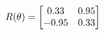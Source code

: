\documentclass[preview]{standalone}
\begin{document}
\begin{align*}
\special{dvisvgm:raw <g id='unique000'>}R(\theta) = \begin{bmatrix}0.33 & 0.95\\-0.95 & 0.33\end{bmatrix}\special{dvisvgm:raw </g>}
\end{align*}
\end{document}

